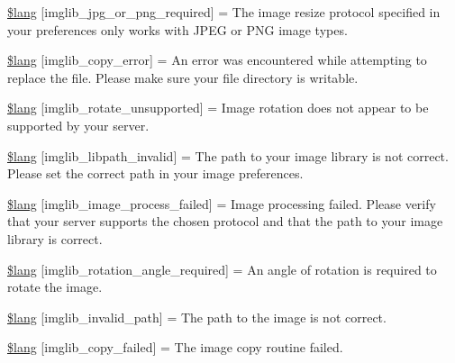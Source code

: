 \begin{DoxyCompactItemize}
\item 
\hyperlink{system_2language_2english_2imglib__lang_8php_a2878e2b878871cd8010970f865d70e71}{\$lang} \mbox{[}\textquotesingle{}imglib\+\_\+jpg\+\_\+or\+\_\+png\+\_\+required\textquotesingle{}\mbox{]} = \textquotesingle{}The image resize protocol specified in your preferences only works with J\+P\+E\+G or P\+N\+G image types.\textquotesingle{}
\item 
\hyperlink{system_2language_2english_2imglib__lang_8php_a012b6a0d2b3a8ef934e8783d2fbd6535}{\$lang} \mbox{[}\textquotesingle{}imglib\+\_\+copy\+\_\+error\textquotesingle{}\mbox{]} = \textquotesingle{}An error was encountered while attempting to replace the file. Please make sure your file directory is writable.\textquotesingle{}
\item 
\hyperlink{system_2language_2english_2imglib__lang_8php_ab1c77c6b58fc5bf8e979ab4237ec87e7}{\$lang} \mbox{[}\textquotesingle{}imglib\+\_\+rotate\+\_\+unsupported\textquotesingle{}\mbox{]} = \textquotesingle{}Image rotation does not appear to be supported by your server.\textquotesingle{}
\item 
\hyperlink{system_2language_2english_2imglib__lang_8php_a8f190c17a02ca89334c8bf0a04333f65}{\$lang} \mbox{[}\textquotesingle{}imglib\+\_\+libpath\+\_\+invalid\textquotesingle{}\mbox{]} = \textquotesingle{}The path to your image library is not correct. Please set the correct path in your image preferences.\textquotesingle{}
\item 
\hyperlink{system_2language_2english_2imglib__lang_8php_a9ac6659eb97dd12e5c714cc9635cf22e}{\$lang} \mbox{[}\textquotesingle{}imglib\+\_\+image\+\_\+process\+\_\+failed\textquotesingle{}\mbox{]} = \textquotesingle{}Image processing failed. Please verify that your server supports the chosen protocol and that the path to your image library is correct.\textquotesingle{}
\item 
\hyperlink{system_2language_2english_2imglib__lang_8php_a1110d59ea8fd0564e78068dbda3438fb}{\$lang} \mbox{[}\textquotesingle{}imglib\+\_\+rotation\+\_\+angle\+\_\+required\textquotesingle{}\mbox{]} = \textquotesingle{}An angle of rotation is required to rotate the image.\textquotesingle{}
\item 
\hyperlink{system_2language_2english_2imglib__lang_8php_a8ff486c25806a4731d1ffe20431df825}{\$lang} \mbox{[}\textquotesingle{}imglib\+\_\+invalid\+\_\+path\textquotesingle{}\mbox{]} = \textquotesingle{}The path to the image is not correct.\textquotesingle{}
\item 
\hyperlink{system_2language_2english_2imglib__lang_8php_a9363000d2005b8276b39d581a11b562d}{\$lang} \mbox{[}\textquotesingle{}imglib\+\_\+copy\+\_\+failed\textquotesingle{}\mbox{]} = \textquotesingle{}The image copy routine failed.\textquotesingle{}

\end{DoxyCompactItemize}
